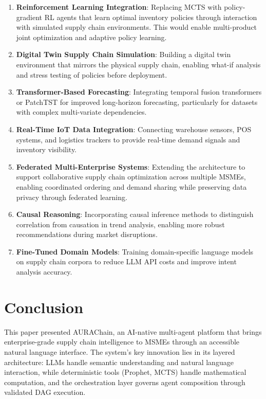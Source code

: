 \documentclass[conference]{IEEEtran}
\begin{document}
\begin{enumerate}
    \item \textbf{Reinforcement Learning Integration}: Replacing MCTS with policy-gradient RL agents that learn optimal inventory policies through interaction with simulated supply chain environments. This would enable multi-product joint optimization and adaptive policy learning.
    
    \item \textbf{Digital Twin Supply Chain Simulation}: Building a digital twin environment that mirrors the physical supply chain, enabling what-if analysis and stress testing of policies before deployment.
    
    \item \textbf{Transformer-Based Forecasting}: Integrating temporal fusion transformers or PatchTST for improved long-horizon forecasting, particularly for datasets with complex multi-variate dependencies.
    
    \item \textbf{Real-Time IoT Data Integration}: Connecting warehouse sensors, POS systems, and logistics trackers to provide real-time demand signals and inventory visibility.
    
    \item \textbf{Federated Multi-Enterprise Systems}: Extending the architecture to support collaborative supply chain optimization across multiple MSMEs, enabling coordinated ordering and demand sharing while preserving data privacy through federated learning.
    
    \item \textbf{Causal Reasoning}: Incorporating causal inference methods to distinguish correlation from causation in trend analysis, enabling more robust recommendations during market disruptions.
    
    \item \textbf{Fine-Tuned Domain Models}: Training domain-specific language models on supply chain corpora to reduce LLM API costs and improve intent analysis accuracy.
\end{enumerate}

\section{Conclusion}

This paper presented AURAChain, an AI-native multi-agent platform that brings enterprise-grade supply chain intelligence to MSMEs through an accessible natural language interface. The system's key innovation lies in its layered architecture: LLMs handle semantic understanding and natural language interaction, while deterministic tools (Prophet, MCTS) handle mathematical computation, and the orchestration layer governs agent composition through validated DAG execution.
\end{document}
